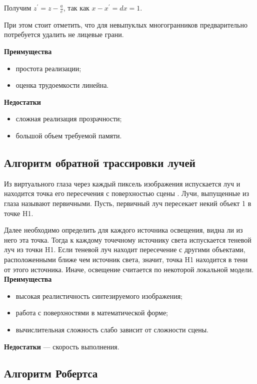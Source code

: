 Получим $z^\prime=z-\frac{a}{c}$, так как $x-x^\prime=dx=1$.

При этом стоит отметить, что для невыпуклых многогранников предварительно потребуется удалить не лицевые грани.

\textbf{Преимущества}
\begin{itemize}[label=---]
	\item простота реализации; 
	\item оценка трудоемкости линейна. 
\end{itemize}

\textbf{Недостатки} 
\begin{itemize}[label=---]
	\item сложная реализация прозрачности; 
	\item большой объем требуемой памяти. 
\end{itemize}

\subsection{Алгоритм обратной трассировки лучей}
Из виртуального глаза через каждый пиксель изображения испускается луч и находится точка его пересечения с поверхностью сцены \cite{raytrace}.
Лучи, выпущенные из глаза называют первичными. 
Пусть, первичный луч пересекает некий объект 1 в точке H1.

Далее необходимо определить для каждого источника освещения, видна ли из него эта точка. 
Тогда к каждому точечному источнику света испускается теневой луч из точки H1.  
Если теневой луч находит пересечение с другими объектами, расположенными ближе чем источник света, значит, точка H1 находится в тени от этого источника. 
Иначе, освещение считается по некоторой локальной модели. 
\newpage
\textbf{Преимущества}
\begin{itemize}[label=---]
	\item высокая реалистичность синтезируемого изображения; 
	\item работа с поверхностями в математической форме; 
	\item вычислительная сложность слабо зависит от сложности сцены.
\end{itemize}

\textbf{Недостатки} --- скорость выполнения. 

\subsection{Алгоритм Робертса} 


